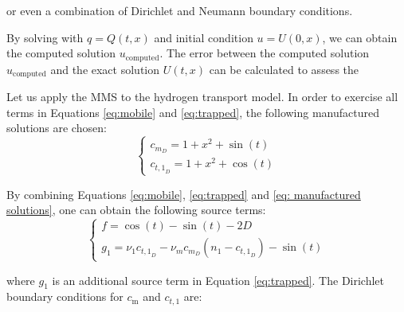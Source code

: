 or even a combination of Dirichlet and Neumann boundary conditions.

By solving  with $q = Q(t, x)$ and initial condition $u = U(0, x)$, we can obtain the computed solution $u_\mathrm{computed}$.
The error between the computed solution $u_\mathrm{computed}$ and the exact solution $U(t, x)$ can be calculated to assess the 

Let us apply the MMS to the hydrogen transport model.
In order to exercise all terms in Equations \ref{eq:mobile} and \ref{eq:trapped}, the following manufactured solutions are chosen:
\begin{equation}
    \begin{cases}
    c_{m_D} = 1 + x^2 + \sin(t) \\
    c_{{t,1}_D} = 1 + x^2 + \cos(t)
    \end{cases}
    \label{eq: manufactured solutions}
\end{equation}

By combining Equations \ref{eq:mobile}, \ref{eq:trapped} and \ref{eq: manufactured solutions}, one can obtain the following source terms:
\begin{equation}
    \begin{cases}
    f = \cos(t) - \sin(t) - 2D \\
    g_1 = \nu_1 c_{{t,1}_D} - \nu_m c_{m_D} ( n_1 - c_{{t,1}_D}) - \sin(t)
    \end{cases}
    \label{eq:sources}
\end{equation}

where $g_1$ is an additional source term in Equation \ref{eq:trapped}.
The Dirichlet boundary conditions for $c_\mathrm{m}$ and $c_{t,1}$ are:

